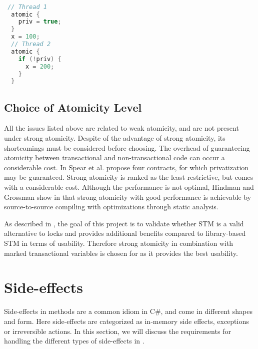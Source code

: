\begin{lstlisting}[label=lst:privatization,
 caption={Privatization Problem},
 language=Java, 
 showspaces=false,
 showtabs=false,
 breaklines=true,
 showstringspaces=false,
 breakatwhitespace=true,
 commentstyle=\color{greencomments},
 keywordstyle=\color{bluekeywords},
 stringstyle=\color{redstrings},
 morekeywords={atomic, retry, orElse, var, get, set}]  % Start your code-block

 // Thread 1
  atomic {
    priv = true;
  }
  x = 100;
  // Thread 2
  atomic {
    if (!priv) {
      x = 200;
    }
  }
\end{lstlisting}

\subsection{Choice of Atomicity Level}
All the issues listed above are related to weak atomicity, and are not present under strong atomicity. Despite of the advantage of strong atomicity, its shortcomings must be considered before choosing. The overhead of guaranteeing atomicity between transactional and non-transactional code can occur a considerable cost\cite{spear2007privatization}. In \cite{spear2007privatization} Spear et al. propose four contracts, for which privatization may be guaranteed. Strong atomicity is ranked as the least restrictive, but comes with a considerable cost. Although the performance is not optimal, Hindman and Grossman show in \cite{hindman2006atomicity} that strong atomicity with good performance is achievable by source-to-source compiling with optimizations through static analysis.

As described in , the goal of this project is to validate whether \ac{STM} is a valid alternative to locks and provides additional benefits compared to library-based \ac{STM} in terms of usability. Therefore strong atomicity in combination with marked transactional variables is chosen for \stmname as it provides the best usability.

\section{Side-effects}\label{sec:side-effects}
Side-effects in methods are a common idiom in C\#, and come in different shapes and form. Here side-effects are categorized as in-memory side effects, exceptions or irreversible actions. In this section, we will discuss the requirements for handling the different types of side-effects in \stmname.

